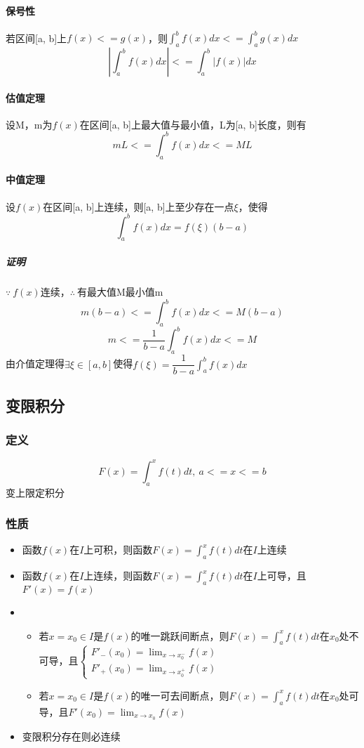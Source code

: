 \paragraph{保号性}
若区间[a, b]上\(f(x) <= g(x)\)，则\(\displaystyle\int_a^bf(x)dx <= \int_a^bg(x)dx\)
\[\displaystyle|\int_a^bf(x)dx| <= \int_a^b|f(x)|dx\]

\paragraph{估值定理}
设M，m为\(f(x)\)在区间[a, b]上最大值与最小值，L为[a, b]长度，则有\[mL <= \displaystyle\int_a^bf(x)dx <= ML\]

\paragraph{中值定理}
设\(f(x)\)在区间[a, b]上连续，则[a, b]上至少存在一点\(\xi\)，使得\[\displaystyle\int_a^bf(x)dx = f(\xi)(b - a)\]

\subparagraph{证明}
\(\because\ f(x)\)连续，\(\therefore\ \)有最大值M最小值m
\[m(b - a) <= \int_a^bf(x)dx <= M(b - a)\]
\[m <= \dfrac{1}{b - a}\int_a^bf(x)dx <= M\]
由介值定理得\(\exists \xi \in [a, b]\)使得\(f(\xi) = \dfrac{1}{b - a}\int_a^bf(x)dx\)


\subsection{变限积分}

\subsubsection{定义}
\[F(x) = \int_a^xf(t)dt,\ a <= x <= b\]
变上限定积分

\subsubsection{性质}
\begin{itemize}
    \item 函数\(f(x)\)在\(I\)上可积，则函数\(F(x) = \displaystyle \int_a^xf(t)dt\)在\(I\)上连续
    \item 函数\(f(x)\)在\(I\)上连续，则函数\(F(x) = \displaystyle \int_a^xf(t)dt\)在\(I\)上可导，且\(F'(x) = f(x)\)
    \item \begin{itemize}
        \item 若\(x = x_0\in I\)是\(f(x)\)的唯一跳跃间断点，则\(F(x) = \int_a^xf(t)dt\)在\(x_0\)处不可导，且\(\begin{cases}
            F'_-(x_0) = \lim_{x \to x_0^-}f(x) \\ 
            F'_+(x_0) = \lim_{x \to x_0^+}f(x)
        \end{cases}\)
        \item 若\(x = x_0\in I\)是\(f(x)\)的唯一可去间断点，则\(F(x) = \int_a^xf(t)dt\)在\(x_0\)处可导，且\(F'(x_0) = \lim_{x \to x_0}f(x)\)
    \end{itemize}
    \item 变限积分存在则必连续
\end{itemize}


